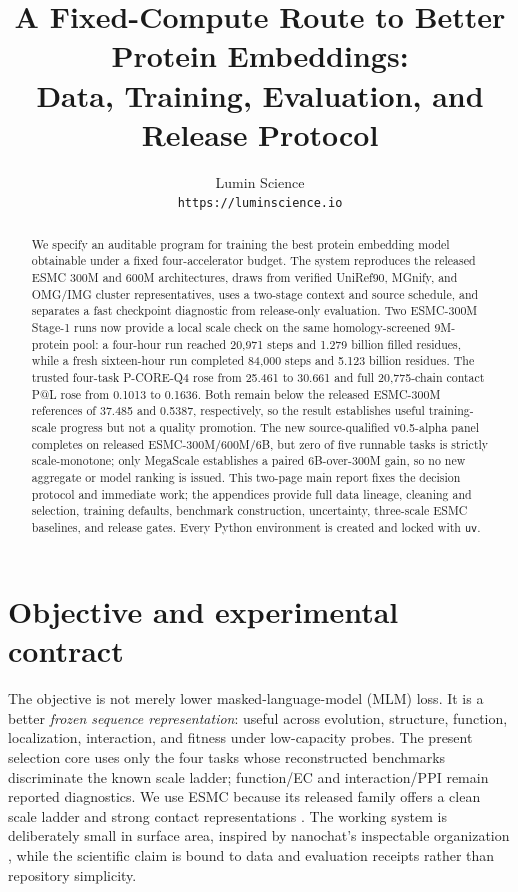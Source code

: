 \documentclass{article}
\title{A Fixed-Compute Route to Better Protein Embeddings:\\
Data, Training, Evaluation, and Release Protocol}
\author{%
  Lumin Science\\
  \texttt{https://luminscience.io}
}
\begin{document}
\raggedbottom
\maketitle

\begin{abstract}
We specify an auditable program for training the best protein embedding model
obtainable under a fixed four-accelerator budget. The system reproduces the
released ESMC 300M and 600M architectures, draws from verified UniRef90,
MGnify, and OMG/IMG cluster representatives, uses a two-stage context and
source schedule, and separates a fast checkpoint diagnostic from release-only
evaluation. Two ESMC-300M Stage-1 runs now provide a local scale check on the
same homology-screened 9M-protein pool: a four-hour run reached 20,971 steps
and 1.279 billion filled residues, while a fresh sixteen-hour run completed
84,000 steps and 5.123 billion residues. The trusted four-task P-CORE-Q4 rose
from 25.461 to 30.661 and full 20,775-chain contact P@L rose from 0.1013 to
0.1636. Both remain below the released ESMC-300M references of 37.485 and
0.5387, respectively, so the result establishes useful training-scale
progress but not a quality promotion. The new source-qualified
v0.5-alpha panel completes on released
ESMC-300M/600M/6B, but zero of five runnable tasks is strictly scale-monotone;
only MegaScale establishes a paired 6B-over-300M gain, so no new aggregate or
model ranking is issued. This two-page main report
fixes the decision protocol and immediate work; the appendices provide full
data lineage, cleaning and selection, training defaults, benchmark
construction, uncertainty, three-scale ESMC baselines, and release gates.
Every Python environment is created and locked with \texttt{uv}.
\end{abstract}

\section{Objective and experimental contract}

The objective is not merely lower masked-language-model (MLM) loss. It is a
better \emph{frozen sequence representation}: useful across evolution,
structure, function, localization, interaction, and fitness under low-capacity
probes. The present selection core uses only the four tasks whose reconstructed
benchmarks discriminate the known scale ladder; function/EC and interaction/PPI
remain reported diagnostics. We use ESMC because its released family offers a clean scale ladder and
strong contact representations \citep{candido2026language}. The working system
is deliberately small in surface area, inspired by nanochat's inspectable
organization \citep{karpathy2025nanochat}, while the scientific claim is bound
to data and evaluation receipts rather than repository simplicity.
\end{document}
